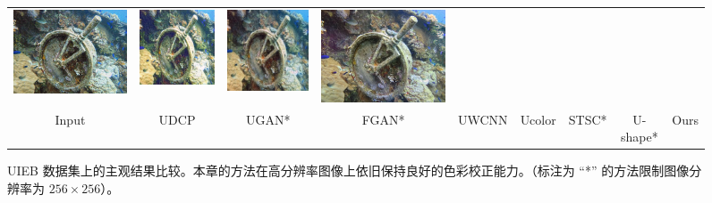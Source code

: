 \begin{figure}[t]
\begin{center}
\begin{tabular}{ccccccccc}
        \includegraphics[width = 0.10\linewidth,height=0.10\linewidth]{figures/ch3/compare/UIEB/Ucolor/41_img_.png}& \hspace{-0.40cm}
        \includegraphics[width = 0.10\linewidth,height=0.10\linewidth]{figures/ch3/compare/UIEB/STSC/41_img_.png}  & \hspace{-0.40cm}
        \includegraphics[width = 0.10\linewidth,height=0.10\linewidth]{figures/ch3/compare/UIEB/Ushape/41_img_.png}& \hspace{-0.40cm} 
        \includegraphics[width = 0.10\linewidth,height=0.10\linewidth]{figures/ch3/compare/UIEB/Ours/41_img_.png} 
        \\
        \scriptsize Input
        & \hspace{-0.51cm} \scriptsize UDCP\cite{udcp}
        & \hspace{-0.51cm} \scriptsize UGAN*\cite{ugan}
        & \hspace{-0.51cm} \scriptsize FGAN*\cite{funie_gan}
        & \hspace{-0.51cm} \scriptsize UWCNN\cite{uwcnn}
        & \hspace{-0.51cm} \scriptsize Ucolor\cite{ucolor}
        & \hspace{-0.51cm} \scriptsize STSC*\cite{stsc}
        & \hspace{-0.51cm} \scriptsize U-shape*\cite{u-shape}
        & \hspace{-0.51cm} \scriptsize Ours
        \\
    \end{tabular}
\end{center}
\vspace{-1mm}
\caption{\label{img:visual-uieb}UIEB 数据集上的主观结果比较。本章的方法在高分辨率图像上依旧保持良好的色彩校正能力。（标注为 “*” 的方法限制图像分辨率为 $256 \times 256$）。}
\vspace{-1mm}
\end{figure}

